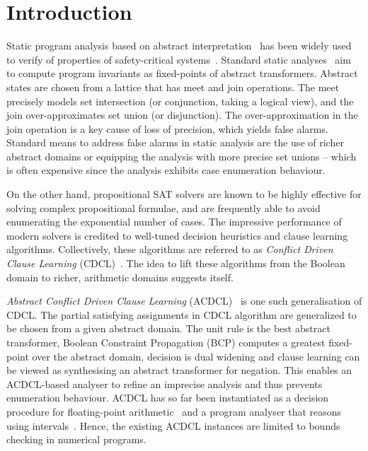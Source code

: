 \section{Introduction}

%
Static program analysis based on abstract interpretation~\cite{CC77} has
been widely used to verify of properties of safety-critical systems~\cite{DBLP:conf/pldi/BlanchetCCFMMMR03}.
Standard static analyses~\cite{se2011} aim to compute program invariants as
fixed-points of abstract transformers.  Abstract states are chosen from a
lattice that has meet and join operations.  The meet precisely models set
intersection (or conjunction, taking a logical view), and the join
over-approximates set union (or disjunction).  The over-approximation in the
join operation is a key cause of loss of precision, which yields false
alarms.  Standard means to address false alarms in static analysis are
the use of richer abstract domains or equipping the analysis with more precise set
unions -- which is often expensive since the analysis exhibits case
enumeration behaviour.

%
On the other hand, propositional SAT solvers are known to be highly
effective for solving complex propositional formulae, and are frequently
able to avoid enumerating the exponential number of cases.  The impressive
performance of modern solvers is credited to well-tuned decision heuristics
and clause learning algorithms.  Collectively, these
algorithms are referred to as \emph{Conflict Driven Clause Learning}
(CDCL)~\cite{cdcl}. The idea to lift these algorithms from the Boolean
domain to richer, arithmetic domains suggests itself.

\emph{Abstract Conflict Driven Clause Learning} (ACDCL)~\cite{dhk2013-popl}
is one such generalisation of CDCL.  The partial satisfying assignments in
CDCL algorithm are generalized to be chosen from a given abstract domain. 
The unit rule is the best abstract transformer, Boolean Constraint
Propagation (BCP) computes a greatest fixed-point over the abstract domain,
decision is dual widening and clause learning can be viewed as synthesising
an abstract transformer for negation.  This enables an ACDCL-based analyser
to refine an imprecise analysis and thus prevents enumeration behaviour. 
ACDCL has so far been instantiated as a decision procedure for
floating-point arithmetic~\cite{DBLP:journals/fmsd/BrainDGHK14} and a
program analyser that reasons using intervals~\cite{tacas12}.  Hence, the
existing ACDCL instances are limited to bounds checking in numerical
programs.

